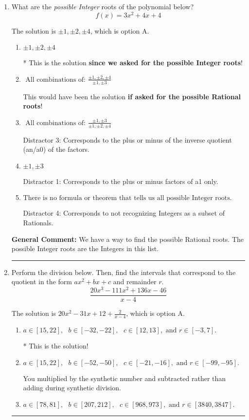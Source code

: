 \documentclass{extbook}[14pt]
\newcommand{\litem}[1]{\item #1

\rule{\textwidth}{0.4pt}}
\begin{document}
\begin{enumerate}\litem{
What are the \textit{possible Integer} roots of the polynomial below?
\[ f(x) = 3x^{2} +4 x + 4 \]

The solution is \( \pm 1,\pm 2,\pm 4 \), which is option A.\begin{enumerate}[label=\Alph*.]
\item \( \pm 1,\pm 2,\pm 4 \)

* This is the solution \textbf{since we asked for the possible Integer roots}!
\item \( \text{ All combinations of: }\frac{\pm 1,\pm 2,\pm 4}{\pm 1,\pm 3} \)

This would have been the solution \textbf{if asked for the possible Rational roots}!
\item \( \text{ All combinations of: }\frac{\pm 1,\pm 3}{\pm 1,\pm 2,\pm 4} \)

 Distractor 3: Corresponds to the plus or minus of the inverse quotient (an/a0) of the factors. 
\item \( \pm 1,\pm 3 \)

 Distractor 1: Corresponds to the plus or minus factors of a1 only.
\item \( \text{There is no formula or theorem that tells us all possible Integer roots.} \)

 Distractor 4: Corresponds to not recognizing Integers as a subset of Rationals.
\end{enumerate}

\textbf{General Comment:} We have a way to find the possible Rational roots. The possible Integer roots are the Integers in this list.
}
\litem{
Perform the division below. Then, find the intervals that correspond to the quotient in the form $ax^2+bx+c$ and remainder $r$.
\[ \frac{20x^{3} -111 x^{2} +136 x -46}{x -4} \]

The solution is \( 20x^{2} -31 x + 12 + \frac{2}{x -4} \), which is option A.\begin{enumerate}[label=\Alph*.]
\item \( a \in [15, 22], \text{   } b \in [-32, -22], \text{   } c \in [12, 13], \text{   and   } r \in [-3, 7]. \)

* This is the solution!
\item \( a \in [15, 22], \text{   } b \in [-52, -50], \text{   } c \in [-21, -16], \text{   and   } r \in [-99, -95]. \)

 You multiplied by the synthetic number and subtracted rather than adding during synthetic division.
\item \( a \in [78, 81], \text{   } b \in [207, 212], \text{   } c \in [968, 973], \text{   and   } r \in [3840, 3847]. \)


\end{enumerate}}
\end{enumerate}
\end{document}
